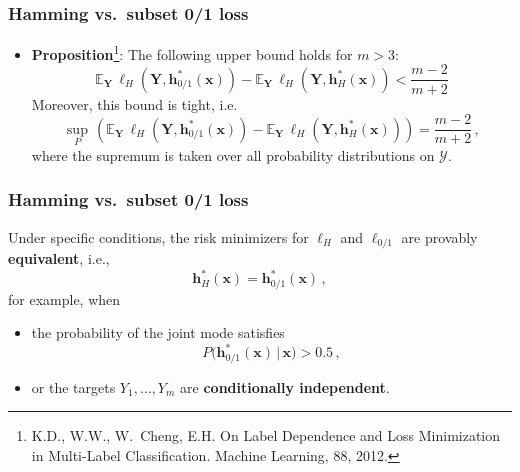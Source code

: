 \documentclass[]{beamer}
\renewcommand{\Pr}{P}
\renewcommand{\vec}[1]{\boldsymbol{#1}}
\newcommand{\given}{\, | \,}
\newcommand{\loss}{L}
\newcommand{\ZO}{0/1 }
\newcommand{\bx}{\boldsymbol{x}}
\newcommand{\bh}{\boldsymbol{h}}
\newcommand{\bY}{\boldsymbol{Y}}
\renewcommand{\emph}[1]{\textbf{\color{putblue}#1}}
\begin{document}
\begin{frame}
\frametitle{Hamming vs.\ subset 0/1 loss}

\begin{itemize}
\item \emph{Proposition}\footnote{K.D., W.W., W.\ Cheng, E.H. On Label Dependence and Loss Minimization in Multi-Label Classification. Machine Learning, 88, 2012.}:
The following upper bound holds for $m > 3$:
$$
\mathbb{E}_{\mathbf{Y}} \, \ell_H(\mathbf{Y}, \mathbf{h}^*_{0/1}(\vec{x})) - \mathbb{E}_{\mathbf{Y}} \, \ell_H(\mathbf{Y}, \mathbf{h}^*_H(\vec{x}))
< \frac{m-2}{m+2}
$$
Moreover, this bound is tight, i.e.
$$
\sup_{\Pr} \, (\mathbb{E}_{\mathbf{Y}} \, \ell_H(\mathbf{Y}, \mathbf{h}^*_{0/1}(\vec{x})) - \mathbb{E}_{\mathbf{Y}}  \, \ell_H(\mathbf{Y}, \mathbf{h}^*_H(\vec{x})))
= \frac{m-2}{m+2}\,,
$$
where the supremum is taken over all probability distributions on $\mathcal{Y}$.
\end{itemize}
\end{frame}


\begin{frame}
\frametitle{Hamming vs.\ subset 0/1 loss}

Under specific conditions, the risk minimizers for $\ell_H$ %
and $\ell_{\ZO}$ %
are provably \emph{equivalent}, i.e.,
$$\bh^*_H(\bx) = \bh^*_{\ZO}(\bx) \,,$$
for example, when

\medskip

\begin{itemize}
\item the probability of the {joint mode} satisfies
$$
\Pr \big(\bh^*_{\ZO} (\bx)\, |\, \bx \big) > 0.5\, ,
$$
\item or the targets $Y_1, \ldots, Y_m$ are \emph{conditionally independent}.
\end{itemize}

\end{frame}
\end{document}
